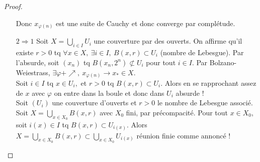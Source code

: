 \begin{proof}
\begin{itemize}
        Donc $x_{\varphi (n)}$ est une suite de Cauchy et donc converge par complétude.
    \item[$2\Rightarrow 1$] Soit $X=\bigcup\limits_{i \in  I} U_i$ une couverture par des ouverts. On affirme qu'il existe $r>0$ tq $\forall x\in X,\ \exists i\in I,\ B(x,r)\subset U_i $ (nombre de Lebesgue). Par l'absurde, soit $(x_{n})$ tq $B(x_{n},2^n)\not\subset U_i$ pour tout $i\in I.$ Par Bolzano-Weiestrass, $\exists \varphi +\nearrow,\ x_{\varphi (n)}\to x_*\in X.$\\
        Soit $i\in I$ tq $x\in U_i,$ et $r>0$ tq $B(x,r)\subset U_i.$ Alors en se rapprochant assez de $x$ avec $\varphi $ on entre dans la boule et donc dans $U_i$ absurde !\\
Soit $(U_i)$ une couverture d’ouverts et $r>0$ le nombre de Lebesgue associé. Soit $X=\bigcup\limits_{x\in  X_0} B(x,r)$ avec $X_0$ fini, par précompacité. Pour tout $x\in X_0$, soit $i(x)\in  I$ tq $B(x,r)\subset  U_{i(x)}$. Alors $X=\bigcup\limits_{x\in  X_0} B(x,r)\subset  \bigcup \limits_{x \in X_0} U_{i(x)}$ réunion finie comme annoncé !
    \end{itemize}
\end{proof}

